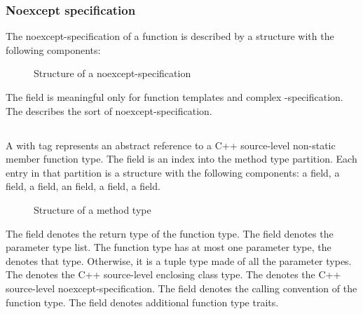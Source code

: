 
\subsubsection{Noexcept specification}
\label{sec:ifc-noexcept-specification}

The noexcept-specification of a function is described by a structure with the following components:
%
\begin{figure}[H]
	\centering
	\caption{Structure of a noexcept-specification}
	\label{fig:ifc-noexception-specification-structure}
\end{figure}
%

The  field is meaningful only for function templates and complex -specification.
The  describes the sort of noexcept-specification. 

\subsection{}
\label{sec:ifc:TypeSort:Method}

A  with tag  represents
an abstract reference to a C++ source-level non-static member function type.
The  field is an index into the method type partition.
Each entry in that partition is a structure with the following components:
a  field, a  field, a  field, an  field,
a  field, a  field.
%
\begin{figure}[H]
	\centering
	\caption{Structure of a method type}
	\label{fig:ifc-method-type-structure}
\end{figure}
%
The  field denotes the return type of the function type.
The  field denotes the parameter type list.  The function type has at most
one parameter type, the  denotes that type. Otherwise, it is a tuple type made
of all the parameter types.
The  denotes the C++ source-level enclosing class type.
The  denotes the C++ source-level noexcept-specification.
The  field denotes the calling convention of the function type.
The  field denotes additional function type traits.



